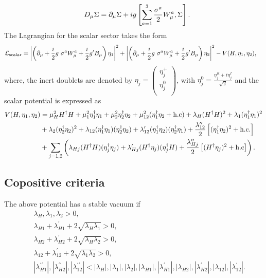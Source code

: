 \documentclass[aps, a4paper,superscriptaddress,12pt,preprintnumbers,floatfix,nofootinbib,amsmath,amssymb]{revtex4}
\newcommand{\nn}{\nonumber}
\begin{document}
\begin{eqnarray}
&& D_\mu \Sigma= \partial_\mu \Sigma + ig \left[\sum_{a=1}^3 \frac{\sigma^a}{2}W^a_\mu, \Sigma\right].
\end{eqnarray}
 The  Lagrangian for the scalar sector takes the form 
 \begin{align}
\mathcal{L}_{\rm scalar} &= \left|\left(\partial_\mu  + \frac{i}{2} g~  \sigma^a W^a_\mu  + \frac{i}{2}g^\prime B_\mu\right) \eta_1\right|^2 +\left|\left(\partial_\mu  + \frac{i}{2} g~  \sigma^a W^a_\mu  + \frac{i}{2}g^\prime B_\mu\right) \eta_2\right|^2 - V(H,\eta_1, \eta_2),
\end{align}
where, the inert doublets are denoted by $\eta_j = \begin{pmatrix}
		 \eta_j^+		\\
		 \eta_j^0	\\
	\end{pmatrix}$, with $\eta_j^0 = \displaystyle{\frac{\eta^R_j+i\eta^I_j}{\sqrt{2}}}$ and the scalar potential is expressed as \cite{Keus:2014jha,Keus:2014isa}
\begin{align}
V(H, \eta_1, \eta_2) &=  \mu^2_H  H^\dagger H +  \mu^2_1 \eta_1^\dagger \eta_1 + \mu^2_2 \eta_2^\dagger \eta_2 +\mu^2_{12} (\eta_1^\dagger \eta_2 + {\rm h.c}) + \lambda_H (H^\dagger H)^2 + \lambda_1 (\eta_1^\dagger \eta_1)^2 \nn\\   
      &+ \lambda_2 (\eta_2^\dagger \eta_2)^2+ \lambda_{12} (\eta_1^\dagger \eta_1) (\eta_2^\dagger \eta_2) + \lambda^\prime_{12} (\eta_1^\dagger \eta_2) (\eta_2^\dagger \eta_1) + \frac{\lambda^{\prime\prime}_{12}}{2} \left[(\eta_1^\dagger \eta_2)^2 + {\rm h.c.}\right] 
       \nonumber\\ &+ \sum_{j=1,2} \left(\lambda_{Hj} (H^\dagger H)(\eta_j^\dagger \eta_j)  
    +  \lambda^\prime_{Hj} (H^\dagger \eta_j)(\eta_j^\dagger H) + \frac{\lambda^{\prime\prime}_{Hj}}{2} \left[(H^\dagger \eta_j)^2 + {\rm h.c}\right]\right).    
\label{scalarpot}
\end{align} 
\newline
\subsection{Copositive criteria}

The above potential has a stable vacuum if \cite{Keus:2014jha}
\begin{eqnarray}
    && \lambda_H,\lambda_1, \lambda_2 > 0,\nn\\
    && \lambda_{H1} + \lambda^\prime_{H1} + 2\sqrt{\lambda_H \lambda_1} > 0,\nn\\
    && \lambda_{H2} + \lambda^\prime_{H2} + 2\sqrt{\lambda_H \lambda_2} > 0,\nn\\
    && \lambda_{12} + \lambda^\prime_{12} + 2\sqrt{\lambda_1 \lambda_2} > 0,\nn\\
    && |\lambda^{\prime\prime}_{H1}|, |\lambda^{\prime\prime}_{H2}|, |\lambda^{\prime\prime}_{12}| < |\lambda_{H}|, |\lambda_{1}| , |\lambda_{2}|, |\lambda_{H1}|,|\lambda^\prime_{H1}|, |\lambda_{H2}|, |\lambda^\prime_{H2}|, |\lambda_{12}|,|\lambda^\prime_{12}|.
\end{eqnarray}
\end{document}
